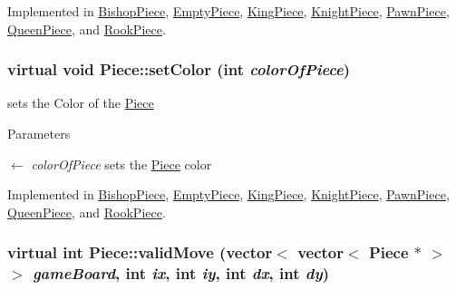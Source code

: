 Implemented in \hyperlink{classBishopPiece_af651439e984e4d28955db75da601b35b}{BishopPiece}, \hyperlink{classEmptyPiece_ad71f9165591337d5df65c4f2500e2d36}{EmptyPiece}, \hyperlink{classKingPiece_ac93de53a7adee6e5ad33284f0fd6aa2e}{KingPiece}, \hyperlink{classKnightPiece_a3b141e4014d09bba70625ccb2129efcc}{KnightPiece}, \hyperlink{classPawnPiece_a0a612a59fd7bb512805329902e829ce6}{PawnPiece}, \hyperlink{classQueenPiece_ae8df61c033b58d7f96e344166a9f2bdb}{QueenPiece}, and \hyperlink{classRookPiece_a45d8858e75e550b72d27d49da0230c0a}{RookPiece}.\hypertarget{classPiece_a1387cb503dca308ac1e3bbe38a70a073}{
\subsubsection[{setColor}]{\setlength{\rightskip}{0pt plus 5cm}virtual void Piece::setColor (int {\em colorOfPiece})}}
\label{classPiece_a1387cb503dca308ac1e3bbe38a70a073}


sets the Color of the \hyperlink{classPiece}{Piece} 
\begin{DoxyParams}{Parameters}
\item[\mbox{$\leftarrow$} {\em colorOfPiece}]sets the \hyperlink{classPiece}{Piece} color \end{DoxyParams}


Implemented in \hyperlink{classBishopPiece_ae75166e3d3bc71f3030268158cba4054}{BishopPiece}, \hyperlink{classEmptyPiece_ae46e7ddf6275c1508528e06929cf2660}{EmptyPiece}, \hyperlink{classKingPiece_ab7a9023dda46c21a566675623f1b4a32}{KingPiece}, \hyperlink{classKnightPiece_a928091c9100f4e3bc2bb2d10535ccc49}{KnightPiece}, \hyperlink{classPawnPiece_a5cfd7bce3cea8ad32c1b8dc8f5c7b253}{PawnPiece}, \hyperlink{classQueenPiece_a691ff6afc7d167dab9cff0c910cae859}{QueenPiece}, and \hyperlink{classRookPiece_ad10584bf27bf3f6f109074b878ef840d}{RookPiece}.\hypertarget{classPiece_a6bc81a2d7211e5a7972cec0a34ebb473}{
\subsubsection[{validMove}]{\setlength{\rightskip}{0pt plus 5cm}virtual int Piece::validMove (vector$<$ vector$<$ {\bf Piece} $\ast$ $>$ $>$ {\em gameBoard}, \/  int {\em ix}, \/  int {\em iy}, \/  int {\em dx}, \/  int {\em dy})}}
\label{classPiece_a6bc81a2d7211e5a7972cec0a34ebb473}


